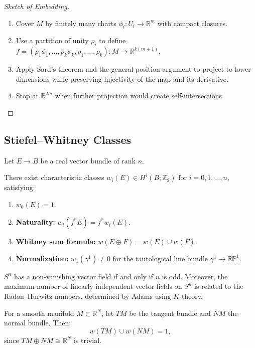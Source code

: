 \begin{proof}[Sketch of Embedding]
\begin{enumerate}
    \item Cover $M$ by finitely many charts $\phi_i: U_i \to \mathbb{R}^m$ with compact closures.
    \item Use a partition of unity $\rho_i$ to define $f = (\rho_1 \phi_1, \dots, \rho_k \phi_k, \rho_1, \dots, \rho_k): M \to \mathbb{R}^{k(m+1)}$.
    \item Apply Sard's theorem and the general position argument to project to lower dimensions while preserving injectivity of the map and its derivative.
    \item Stop at $\mathbb{R}^{2m}$ when further projection would create self-intersections.
\end{enumerate}
\end{proof}

\subsection{Stiefel--Whitney Classes}

Let $E \to B$ be a real vector bundle of rank $n$.

\begin{definition}
There exist characteristic classes $w_i(E) \in H^i(B; \mathbb{Z}_2)$ for $i = 0,1,\dots,n$, satisfying:
\begin{enumerate}
    \item $w_0(E) = 1$.
    \item \textbf{Naturality:} $w_i(f^*E) = f^*w_i(E)$.
    \item \textbf{Whitney sum formula:} $w(E \oplus F) = w(E) \cup w(F)$.
    \item \textbf{Normalization:} $w_1(\gamma^1) \neq 0$ for the tautological line bundle $\gamma^1 \to \mathbb{RP}^1$.
\end{enumerate}
\end{definition}

\begin{theorem}
$S^n$ has a non-vanishing vector field if and only if $n$ is odd. Moreover, the maximum number of linearly independent vector fields on $S^n$ is related to the Radon--Hurwitz numbers, determined by Adams using $K$-theory.
\end{theorem}

\begin{theorem}
For a smooth manifold $M \subset \mathbb{R}^N$, let $TM$ be the tangent bundle and $NM$ the normal bundle. Then:
\[
w(TM) \cup w(NM) = 1,
\]
since $TM \oplus NM \cong \mathbb{R}^N$ is trivial.
\end{theorem}

